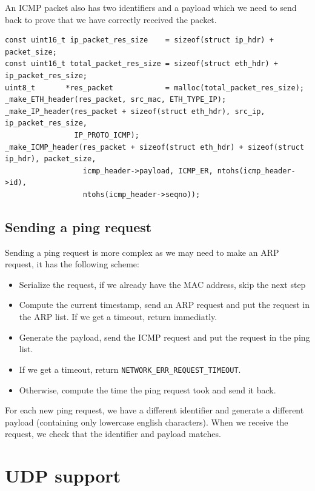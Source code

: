 An ICMP packet also has two identifiers and a payload which we need to send back to prove that we have correctly received the packet.

\begin{lstlisting}[caption={Replying to an ICMP packet}]
const uint16_t ip_packet_res_size    = sizeof(struct ip_hdr) + packet_size;
const uint16_t total_packet_res_size = sizeof(struct eth_hdr) + ip_packet_res_size;
uint8_t       *res_packet            = malloc(total_packet_res_size);
_make_ETH_header(res_packet, src_mac, ETH_TYPE_IP);
_make_IP_header(res_packet + sizeof(struct eth_hdr), src_ip, ip_packet_res_size,
                IP_PROTO_ICMP);
_make_ICMP_header(res_packet + sizeof(struct eth_hdr) + sizeof(struct ip_hdr), packet_size,
                  icmp_header->payload, ICMP_ER, ntohs(icmp_header->id),
                  ntohs(icmp_header->seqno));
\end{lstlisting}

\subsection{Sending a ping request}

Sending a ping request is more complex as we may need to make an ARP request, it has the following scheme:
\begin{itemize}
\item Serialize the request, if we already have the MAC address, skip the next step
\item Compute the current timestamp, send an ARP request and put the request in the ARP list. If we get a timeout, return immediatly.
\item Generate the payload, send the ICMP request and put the request in the ping list.
\item If we get a timeout, return \verb|NETWORK_ERR_REQUEST_TIMEOUT|.
\item Otherwise, compute the time the ping request took and send it back.
\end{itemize}

For each new ping request, we have a different identifier and generate a different payload (containing only lowercase english characters). When we receive the request, we check that the identifier and payload matches.

\section{UDP support}

